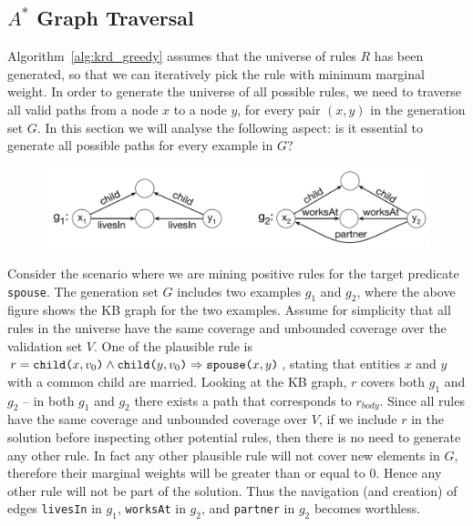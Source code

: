 \subsection{$A^*$ Graph Traversal}
Algorithm~\ref{alg:krd_greedy} assumes that the universe of rules $R$ has been generated, so that we can iteratively pick the rule with minimum marginal weight. In order to generate the universe of all possible rules, we need to traverse all valid paths from a node $x$ to a node $y$, for every pair $(x,y)$ in the generation set $G$. In this section we will analyse the following aspect: is it essential to generate all possible paths for every example in $G$?

\begin{example}
	\begin{figure}[htb]
		\centering
		\includegraphics[width=0.9\columnwidth]{include/figure/a*_graph_example.pdf}
	\end{figure}
	Consider the scenario where we are mining positive rules for the target predicate \texttt{spouse}. The generation set $G$ includes two examples $g_1$ and $g_2$, where the above figure shows the KB graph for the two examples. Assume for simplicity that all rules in the universe have the same coverage and unbounded coverage over the validation set $V$.
	One of the plausible rule is $r = \texttt{child(}x,v_0\texttt{)} \wedge \texttt{child(}y,v_0\texttt{)} \Rightarrow \texttt{spouse(}x,y\texttt{)}$, stating that entities $x$ and $y$ with a common child are married. Looking at the KB graph, $r$ covers both $g_1$ and $g_2$ -- in both $g_1$ and $g_2$ there exists a path that corresponds to $r_{body}$. Since all rules have the same coverage and unbounded coverage over $V$, if we include $r$ in the solution before inspecting other potential rules, then there is no need to generate any other rule. In fact any other plausible rule will not cover new elements in $G$, therefore their marginal weights will be greater than or equal to $0$. Hence any other rule will not be part of the solution. Thus the navigation (and creation) of edges \texttt{livesIn} in $g_1$, \texttt{worksAt} in $g_2$, and \texttt{partner} in $g_2$ becomes worthless.
\end{example}

